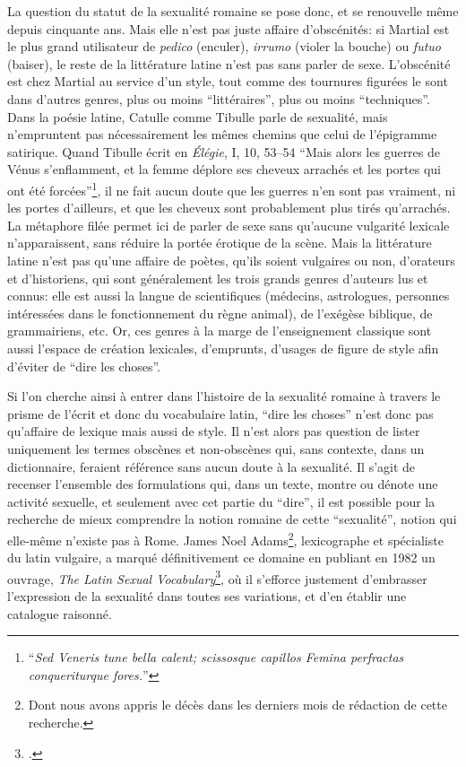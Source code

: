 La question du statut de la sexualité romaine se pose donc, et se renouvelle même depuis cinquante ans. Mais elle n'est pas juste affaire d'obscénités: si Martial est le plus grand utilisateur de \textit{pedico} (enculer), \textit{irrumo} (violer la bouche) ou \textit{futuo} (baiser), le reste de la littérature latine n'est pas sans parler de sexe. L'obscénité est chez Martial au service d'un style, tout comme des tournures figurées le sont dans d'autres genres, plus ou moins \enquote{littéraires}, plus ou moins \enquote{techniques}. Dans la poésie latine, Catulle comme Tibulle parle de sexualité, mais n'empruntent pas nécessairement les mêmes chemins que celui de l'épigramme satirique. Quand Tibulle écrit en \textit{Élégie}, I, 10, 53--54 \enquote{Mais alors les guerres de Vénus s'enflamment, et la femme déplore ses cheveux arrachés et les portes qui ont été forcées}\footnote{\enquote{\textit{Sed Veneris tune bella calent; scissosque capillos Femina perfractas conqueriturque fores.}}}, il ne fait aucun doute que les guerres n'en sont pas vraiment, ni les portes d'ailleurs, et que les cheveux sont probablement plus tirés qu'arrachés. La métaphore filée permet ici de parler de sexe sans qu'aucune vulgarité lexicale n'apparaissent, sans réduire la portée érotique de la scène. Mais la littérature latine n'est pas qu'une affaire de poètes, qu'ils soient vulgaires ou non, d'orateurs et d'historiens, qui sont généralement les trois grands genres d'auteurs lus et connus: elle est aussi la langue de scientifiques (médecins, astrologues, personnes intéressées dans le fonctionnement du règne animal), de l'exégèse biblique, de grammairiens, etc. Or, ces genres à la marge de l'enseignement classique sont aussi l'espace de création lexicales, d'emprunts, d'usages de figure de style afin d'éviter de \enquote{dire les choses}.

Si l'on cherche ainsi à entrer dans l'histoire de la sexualité romaine à travers le prisme de l'écrit et donc du vocabulaire latin, \enquote{dire les choses} n'est donc pas qu'affaire de lexique mais aussi de style. Il n'est alors pas question de lister uniquement les termes obscènes et non-obscènes qui, sans contexte, dans un dictionnaire, feraient référence sans aucun doute à la sexualité. Il s'agit de recenser l'ensemble des formulations qui, dans un texte, montre ou dénote une activité sexuelle, et seulement avec cet partie du \enquote{dire}, il est possible pour la recherche de mieux comprendre la notion romaine de cette \enquote{sexualité}, notion qui elle-même n'existe pas à Rome. James Noel Adams\footnote{Dont nous avons appris le décès dans les derniers mois de rédaction de cette recherche.}, lexicographe et spécialiste du latin vulgaire, a marqué définitivement ce domaine en publiant en 1982 un ouvrage, \textit{The Latin Sexual Vocabulary}\footcite{adams}, où il s'efforce justement d'embrasser l'expression de la sexualité dans toutes ses variations, et d'en établir une catalogue raisonné.

